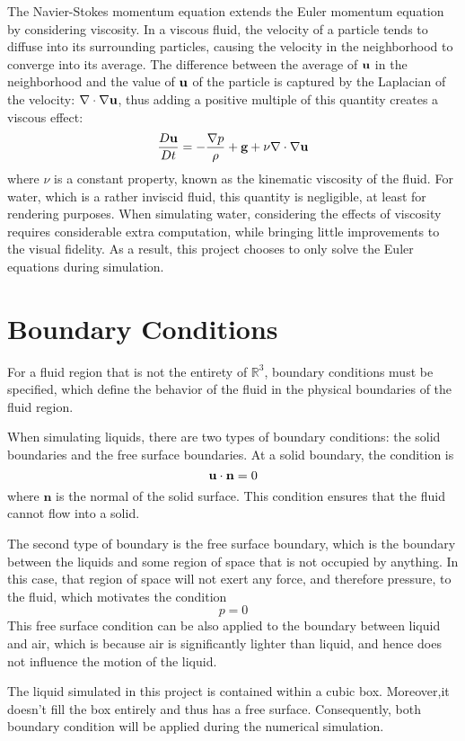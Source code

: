 The Navier-Stokes momentum equation extends the Euler momentum equation by considering viscosity. In a viscous fluid, the velocity of a particle tends to diffuse into its surrounding particles, causing the velocity in the neighborhood to converge into its average. The difference between the average of $\textbf{u}$ in the neighborhood and the value of $\textbf{u}$ of the particle is captured by the Laplacian of the velocity: $\nabla \cdot \nabla \textbf{u}$, thus adding a positive multiple of this quantity creates a viscous effect:
$$
\frac{D\textbf{u}}{Dt}   =   -\frac{\nabla p}{\rho} + \textbf{g} + \nu \nabla \cdot \nabla \textbf{u} 
$$
where $\nu$ is a constant property, known as the kinematic viscosity of the fluid. For water, which is a rather inviscid fluid, this quantity is negligible, at least for rendering purposes. When simulating water, considering the effects of viscosity requires considerable extra computation, while bringing little improvements to the visual fidelity. As a result, this project chooses to only solve the Euler equations during simulation. 


\section{Boundary Conditions}
\label{section boundary conditions}
For a fluid region that is not the entirety of $\mathbb{R}^3$, boundary conditions must be specified, which define the behavior of the fluid in the physical boundaries of the fluid region.

When simulating liquids, there are two types of boundary conditions: the solid boundaries and the free surface boundaries. At a solid boundary, the condition is 
$$
    \textbf{u} \cdot \textbf{n} = 0
$$
where $\textbf{n}$ is the normal of the solid surface. This condition ensures that the fluid cannot flow into a solid. 

The second type of boundary is the free surface boundary, which is the boundary between the liquids and some region of space that is not occupied by anything. In this case, that region of space will not exert any force, and therefore pressure, to the fluid, which motivates the condition
$$
p = 0
$$
This free surface condition can be also applied to the boundary between liquid and air, which is because air is significantly lighter than liquid, and hence does not influence the motion of the liquid.

The liquid simulated in this project is contained within a cubic box. Moreover,it doesn't fill the box entirely and thus has a free surface. Consequently, both boundary condition will be applied during the numerical simulation. 

